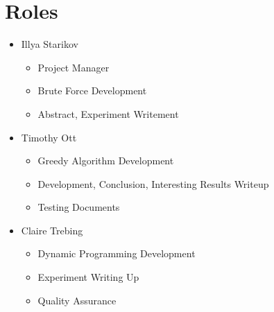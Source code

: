 \documentclass{article}
\begin{document}
\section{Roles}
\begin{itemize}
    \item Illya Starikov
    \begin{itemize}
        \item Project Manager
        \item Brute Force Development
        \item Abstract, Experiment Writement
    \end{itemize}
    \item Timothy Ott
    \begin{itemize}
        \item Greedy Algorithm Development
        \item Development, Conclusion, Interesting Results Writeup
        \item Testing Documents
    \end{itemize}

    \item Claire Trebing
    \begin{itemize}
        \item Dynamic Programming Development
        \item Experiment Writing Up
        \item Quality Assurance
    \end{itemize}
\end{itemize}
\end{document}
